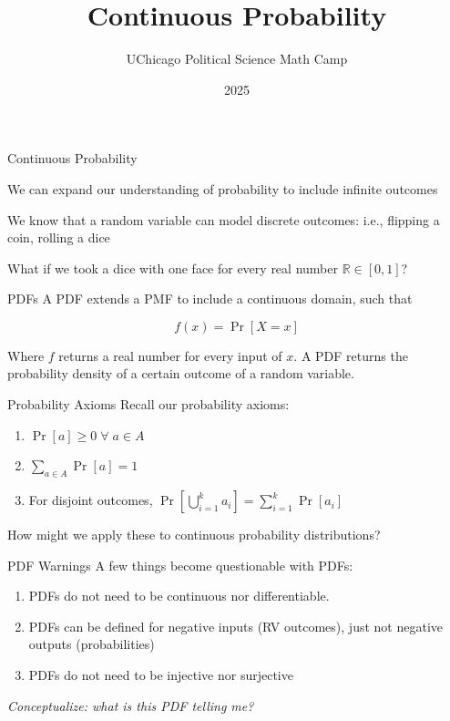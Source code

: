 \documentclass[10pt]{beamer}
\title{Continuous Probability}
\author{UChicago Political Science Math Camp}
\institute{Ryan Gibbons \& Luke Cain}
\date{2025}
\begin{document}
\frame{\titlepage}

\begin{frame}{Continuous Probability}

We can expand our understanding of probability to include infinite outcomes \\

\vspace{.5cm}

We know that a random variable can model discrete outcomes: i.e., flipping a coin, rolling a dice \\

\vspace{.5cm}

What if we took a dice with one face for every real number $\mathbb{R} \in [0,1]$?
    
\end{frame}

\begin{frame}{PDFs}
    A PDF extends a PMF to include a continuous domain, such that

    \[f(x) = \Pr[X=x]\]

    Where $f$ returns a real number for every input of $x$. A PDF returns the probability density of a certain outcome of a random variable.
\end{frame}

\begin{frame}{Probability Axioms}
    Recall our probability axioms:

    \begin{enumerate}
        \item $\Pr[a] \geq 0 \; \forall \; a \in A$
        \item $\sum_{a \in A} \Pr[a] = 1$
        \item For disjoint outcomes, $\Pr[\bigcup_{i=1}^k a_i] = \sum_{i=1}^k \Pr[a_i]$
    \end{enumerate}

    How might we apply these to continuous probability distributions?
\end{frame}

\begin{frame}{PDF Warnings}
    A few things become questionable with PDFs:
    \begin{enumerate}
        \item PDFs do not need to be continuous nor differentiable.
        \item PDFs can be defined for negative inputs (RV outcomes), just not negative outputs (probabilities)
        \item PDFs do not need to be injective nor surjective
    \end{enumerate}

    \textit{Conceptualize: what is this PDF telling me?}
\end{frame}
\end{document}
